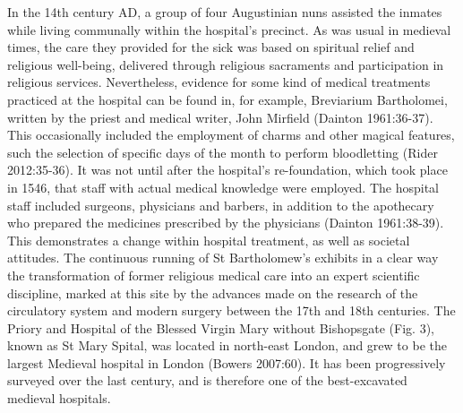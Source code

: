 \documentclass[%
	]{ijsra}
\begin{document}
In the 14th century AD, a group of four Augustinian nuns assisted the inmates while living communally within the hospital’s precinct. As was usual in medieval times, the care they provided for the sick was based on spiritual relief and religious well-being, delivered through religious sacraments and participation in religious services. 
Nevertheless, evidence for some kind of medical treatments practiced at the hospital can be found in, for example, Breviarium Bartholomei, written by the priest and medical writer, John Mirfield (Dainton 1961:36-37). This occasionally included the employment of charms and other magical features, such the selection of specific days of the month to perform bloodletting (Rider 2012:35-36). It was not until after the hospital’s re-foundation, which took place in 1546, that staff with actual medical knowledge were employed. The hospital staff included surgeons, physicians and barbers, in addition to the apothecary who prepared the medicines prescribed by the physicians (Dainton 1961:38-39). This demonstrates a change within hospital treatment, as well as societal attitudes.  
The continuous running of St Bartholomew’s exhibits in a clear way the transformation of former religious medical care into an expert scientific discipline, marked at this site by the advances made on the research of the circulatory system and modern surgery between the 17th and 18th centuries.
\IJSRAseparator
{}
The Priory and Hospital of the Blessed Virgin Mary without Bishopsgate (Fig. 3), known as St Mary Spital, was located in north-east London, and grew to be the largest Medieval hospital in London (Bowers 2007:60). It has been progressively surveyed over the last century, and is therefore one of the best-excavated medieval hospitals. 
\end{document}
